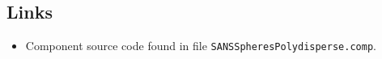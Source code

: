 \subsection*{Links}
\begin{itemize}
  \item Component source code found in file \texttt{SANSSpheresPolydisperse.comp}.
\end{itemize}
